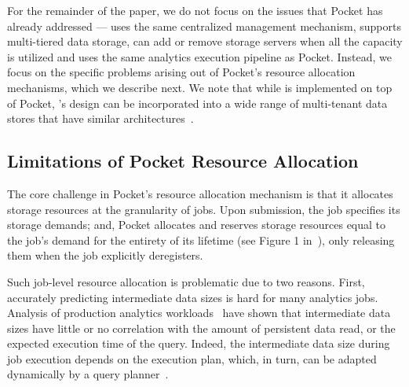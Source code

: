 \vspace{0.1in}
\noindent
For the remainder of the paper, we do not focus on the issues that Pocket has already addressed --- \jiffy uses the same centralized management mechanism, supports multi-tiered data storage, can add or remove storage servers when all the capacity is utilized and uses the same analytics execution pipeline as Pocket. Instead, we focus on the specific problems arising out of Pocket's resource allocation mechanisms, which we describe next. We note that while \jiffy is implemented on top of Pocket, \jiffy's design can be incorporated into a wide range of multi-tenant data stores that have similar architectures~\cite{snowset, crail, hdfs, pisces, memshare}. %

\subsection{Limitations of Pocket Resource Allocation}
\label{ssec:pocketlimit}
The core challenge in Pocket's resource allocation mechanism is that it allocates storage resources at the granularity of jobs. Upon submission, the job specifies its storage demands; and, Pocket allocates and reserves storage resources equal to the job's demand for the entirety of its lifetime (see Figure 1 in~\cite{pocket}), only releasing them when the job explicitly deregisters. 

Such job-level resource allocation is problematic due to two reasons. First, accurately predicting intermediate data sizes is hard for many analytics jobs. Analysis of production analytics workloads~\cite{snowset} have shown that intermediate data sizes have little or no correlation with the amount of persistent data read, or the expected execution time of the query. Indeed, the intermediate data size during job execution depends on the execution plan, which, in turn, can be adapted dynamically by a query planner~\cite{qoop}. 

